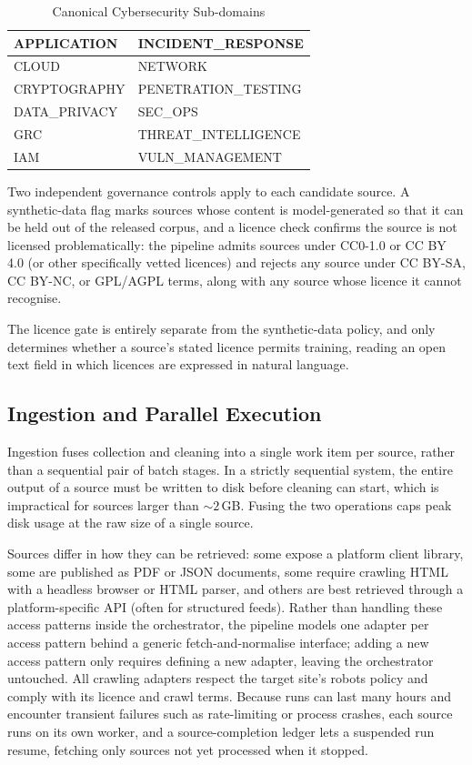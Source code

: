 \documentclass[conference]{IEEEtran}
\begin{document}
\begin{table}[htbp]
\centering
\caption{Canonical Cybersecurity Sub-domains}
\label{tab:cybersec_subdomains}
\begin{tabular}{|l|l|}
\hline
APPLICATION          & INCIDENT\_RESPONSE   \\ \hline
CLOUD                & NETWORK              \\ \hline
CRYPTOGRAPHY         & PENETRATION\_TESTING \\ \hline
DATA\_PRIVACY        & SEC\_OPS             \\ \hline
GRC                  & THREAT\_INTELLIGENCE \\ \hline
IAM                  & VULN\_MANAGEMENT     \\ \hline
\end{tabular}
\end{table}


Two independent governance controls apply to each candidate source. A synthetic-data flag marks sources whose content is model-generated so that it can be held out of the released corpus, and a licence check confirms the source is not licensed problematically: the pipeline admits sources under CC0-1.0 or CC BY 4.0 (or other specifically vetted licences) and rejects any source under CC BY-SA, CC BY-NC, or GPL/AGPL terms, along with any source whose licence it cannot recognise.

The licence gate is entirely separate from the synthetic-data policy, and only determines whether a source's stated licence permits training, reading an open text field in which licences are expressed in natural language.

\subsection{Ingestion and Parallel Execution}

Ingestion fuses collection and cleaning into a single work item per source, rather than a sequential pair of batch stages. In a strictly sequential system, the entire output of a source must be written to disk before cleaning can start, which is impractical for sources larger than ${\sim}2$\,GB. Fusing the two operations caps peak disk usage at the raw size of a single source.

Sources differ in how they can be retrieved: some expose a platform client library, some are published as PDF or JSON documents, some require crawling HTML with a headless browser or HTML parser, and others are best retrieved through a platform-specific API (often for structured feeds). Rather than handling these access patterns inside the orchestrator, the pipeline models one adapter per access pattern behind a generic fetch-and-normalise interface; adding a new access pattern only requires defining a new adapter, leaving the orchestrator untouched. All crawling adapters respect the target site's robots policy and comply with its licence and crawl terms. Because runs can last many hours and encounter transient failures such as rate-limiting or process crashes, each source runs on its own worker, and a source-completion ledger lets a suspended run resume, fetching only sources not yet processed when it stopped.
\end{document}
